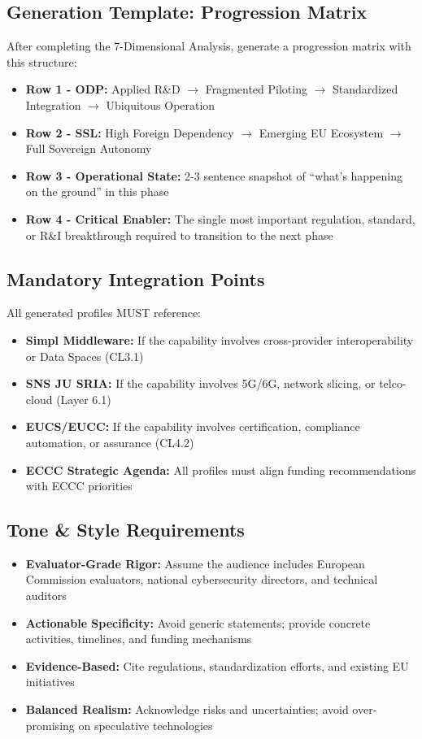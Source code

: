 \documentclass{ieeeaccess}
\begin{document}
\subsection*{Generation Template: Progression Matrix}
After completing the 7-Dimensional Analysis, generate a progression matrix with this structure:

\begin{itemize}
    \item \textbf{Row 1 - ODP:} Applied R\&D $\rightarrow$ Fragmented Piloting $\rightarrow$ Standardized Integration $\rightarrow$ Ubiquitous Operation
    \item \textbf{Row 2 - SSL:} High Foreign Dependency $\rightarrow$ Emerging EU Ecosystem $\rightarrow$ Full Sovereign Autonomy
    \item \textbf{Row 3 - Operational State:} 2-3 sentence snapshot of ``what's happening on the ground''  in this phase
    \item \textbf{Row 4 - Critical Enabler:} The single most important regulation, standard, or R\&I breakthrough required to transition to the next phase
\end{itemize}

\subsection*{Mandatory Integration Points}
All generated profiles MUST reference:
\begin{itemize}
    \item \textbf{Simpl Middleware:} If the capability involves cross-provider interoperability or Data Spaces (CL3.1)
    \item \textbf{SNS JU SRIA:} If the capability involves 5G/6G, network slicing, or telco-cloud (Layer 6.1)
    \item \textbf{EUCS/EUCC:} If the capability involves certification, compliance automation, or assurance (CL4.2)
    \item \textbf{ECCC Strategic Agenda:} All profiles must align funding recommendations with ECCC priorities
\end{itemize}

\subsection*{Tone \& Style Requirements}
\begin{itemize}
    \item \textbf{Evaluator-Grade Rigor:} Assume the audience includes European Commission evaluators, national cybersecurity directors, and technical auditors
    \item \textbf{Actionable Specificity:} Avoid generic statements; provide concrete activities, timelines, and funding mechanisms
    \item \textbf{Evidence-Based:} Cite regulations, standardization efforts, and existing EU initiatives
    \item \textbf{Balanced Realism:} Acknowledge risks and uncertainties; avoid over-promising on speculative technologies
\end{itemize}
\end{document}
